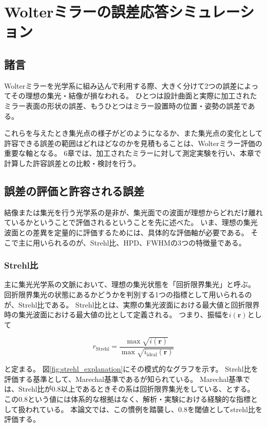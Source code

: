 \documentclass[dvipdfmx,autodetect-engine]{jreport}
\begin{document}
\newpage
\chapter{Wolterミラーの誤差応答シミュレーション}
\minitoc

\newpage
\section{諸言}
Wolterミラーを光学系に組み込んで利用する際、大きく分けて2つの誤差によってその理想の集光・結像が損なわれる。
ひとつは設計曲面と実際に加工されたミラー表面の形状の誤差、もうひとつはミラー設置時の位置・姿勢の誤差である。

これらを与えたとき集光点の様子がどのようになるか、また集光点の変化として許容できる誤差の範囲はどれほどなのかを見積もることは、Wolterミラー評価の重要な軸となる。
6章では、加工されたミラーに対して測定実験を行い、本章で計算した許容誤差との比較・検討を行う。

\section{誤差の評価と許容される誤差}
結像または集光を行う光学系の是非が、集光面での波面が理想からどれだけ離れているかということで評価されるということを先に述べた。
いま、理想の集光波面との差異を定量的に評価するためには、具体的な評価軸が必要である。
そこで主に用いられるのが、Strehl比、HPD、FWHMの3つの特徴量である。

\subsection{Strehl比}
主に集光光学系の文脈において、理想の集光状態を「回折限界集光」と呼ぶ。
回折限界集光の状態にあるかどうかを判別する1つの指標として用いられるのが、Strehl比である。
Strehl比とは、実際の集光波面における最大値と回折限界時の集光波面における最大値の比として定義される。
つまり、振幅を$i(\mathbf{r})$として

\[
r_{\mathrm{Strehl}} = \frac{ \max{\sqrt{i(\mathbf{r})} } }{ \max{ \sqrt{i_{\mathrm{ideal}}( \mathbf{r} )} } }
\]

と定まる。
図\ref{fig:strehl_explanation}にその模式的なグラフを示す。
Strehl比を評価する基準として、Marechal基準である\citep{bornwolf:1999:book}が知られている。
Marechal基準では、Strehl比が0.8以上であるときその系は回折限界集光をしている、とする。
この0.8という値には体系的な根拠はなく、解析・実験における経験的な指標として扱われている。
本論文では、この慣例を踏襲し、0.8を閾値としてstrehl比を評価する。
\end{document}
